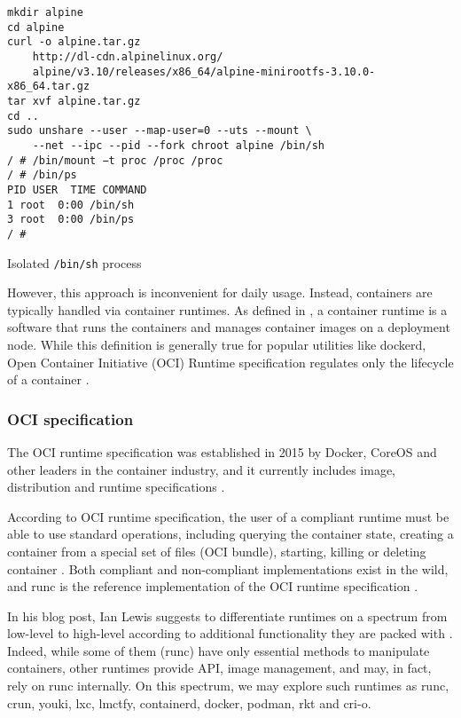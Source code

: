 \begin{listing}[htp]
  \centering
  \begin{minipage}{0.9\linewidth}
      \begin{verbatim}
mkdir alpine
cd alpine
curl -o alpine.tar.gz
    http://dl-cdn.alpinelinux.org/
    alpine/v3.10/releases/x86_64/alpine-minirootfs-3.10.0-x86_64.tar.gz
tar xvf alpine.tar.gz
cd ..
sudo unshare --user --map-user=0 --uts --mount \ 
    --net --ipc --pid --fork chroot alpine /bin/sh
/ # /bin/mount −t proc /proc /proc
/ # /bin/ps
PID USER  TIME COMMAND
1 root  0:00 /bin/sh
3 root  0:00 /bin/ps
/ #
      \end{verbatim}
  \end{minipage}
  \caption{Isolated \texttt{/bin/sh} process}
  \label{lst:isolated_process}
\end{listing}

However, this approach is inconvenient for daily usage. Instead, containers are typically handled via container runtimes. As defined in \cite{c:4}, a container runtime is a software that runs the containers and manages container images on a deployment node. While this definition is generally true for popular utilities like dockerd, Open Container Initiative (OCI) Runtime specification regulates only the lifecycle of a container \cite{b:ianlewis1}.

\subsubsection{OCI specification}

The OCI runtime specification was established in 2015 by Docker, CoreOS and other leaders in the container industry, and it currently includes image, distribution and runtime specifications \cite{s:oci}.

According to OCI runtime specification, the user of a compliant runtime must be able to use standard operations, including querying the container state, creating a container from a special set of files (OCI bundle), starting, killing or deleting container \cite{d:ocirunspec}. Both compliant and non-compliant implementations exist in the wild, and runc is the reference implementation of the OCI runtime specification \cite{c:4}.

In his blog post, Ian Lewis suggests to differentiate runtimes on a spectrum from low-level to high-level according to additional functionality they are packed with \cite{b:ianlewis1}. Indeed, while some of them (runc) have only essential methods to manipulate containers, other runtimes provide API, image management, and may, in fact, rely on runc internally. On this spectrum, we may explore such runtimes as runc, crun, youki, lxc, lmctfy, containerd, docker, podman, rkt and cri-o.

